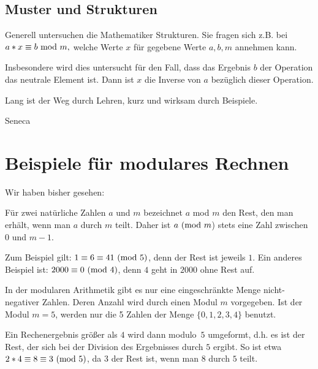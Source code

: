 \begin{refsegment}
\hypertarget{Chapter_ElementaryNT_5_2}{}
\subsection{Muster und Strukturen} 
\label{Label_Chapter_ElementaryNT_5_2}

Generell untersuchen die Mathematiker \glqq Strukturen\grqq. Sie fragen sich
z.B. bei $ a * x \equiv b {\rm ~mod~ } m, $ welche Werte $x$ für gegebene
Werte $a,b,m$ annehmen kann.

Insbesondere wird dies untersucht für den Fall, dass das Ergebnis $b$ der
Operation das neutrale Element ist. Dann ist $x$ die Inverse von $a$
bezüglich dieser Operation.




\newpage
\begin{ctsquote}
    Lang ist der Weg durch Lehren, kurz und wirksam durch Beispiele.
\caption[Seneca]{Seneca\footnotemark}
\end{ctsquote}
\addtocounter{footnote}{0}

\section{Beispiele für modulares Rechnen}

Wir haben bisher gesehen:

Für zwei natürliche Zahlen $a$ und $m$ bezeichnet  $a$ mod $m$  den Rest, den
man erhält, wenn man $a$ durch $m$ teilt. Daher ist $a {\rm ~(mod~ } m$) stets
eine Zahl zwischen $0$ und $m-1$.

Zum Beispiel gilt: $1 \equiv  6  \equiv  41 {\rm ~(mod~ } 5)$, denn der Rest
ist jeweils $1$. Ein anderes Beispiel ist: $2000  \equiv  0 {\rm ~(mod~ } 4)$,
denn $4$ geht in $2000$ ohne Rest auf.

In der modularen Arithmetik gibt es nur eine eingeschränkte Menge
nicht-negativer Zahlen. Deren Anzahl wird durch einen Modul $m$ vorgegeben.
Ist der Modul $m = 5$, werden nur die 5 Zahlen der Menge $\{ 0, 1, 2, 3, 4\}$
benutzt.

Ein Rechenergebnis größer als $4$ wird dann \glqq modulo\grqq~$5$ umgeformt, d.h.
es ist der Rest, der sich bei der Division des Ergebnisses durch $5$ ergibt.
So ist etwa $2*4 \equiv 8 \equiv 3 {\rm ~(mod~ } 5)$, da $3$ der Rest ist,
wenn man $8$ durch $5$ teilt.



\end{refsegment}
